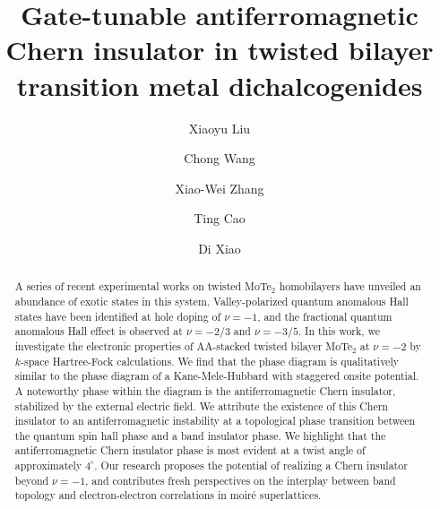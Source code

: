 \documentclass[twocolumn,aps,prl,superscriptaddress]{revtex4-2}
\begin{document}
\title{Gate-tunable antiferromagnetic Chern insulator in twisted bilayer transition metal dichalcogenides}

\author{Xiaoyu Liu}
\author{Chong Wang}
\author{Xiao-Wei Zhang}
\author{Ting Cao}
\author{Di Xiao}

\begin{abstract}
A series of recent experimental works on twisted MoTe$_2$ homobilayers have unveiled an abundance of exotic states in this system. Valley-polarized quantum anomalous Hall states have been identified at hole doping of $\nu = -1$, and the fractional quantum anomalous Hall effect is observed at $\nu = -2/3$ and $\nu = -3/5$. In this work, we investigate the electronic properties of AA-stacked twisted bilayer MoTe$_2$ at $\nu=-2$ by $k$-space Hartree-Fock calculations. We find that the phase diagram is qualitatively similar to the phase diagram of a Kane-Mele-Hubbard with staggered onsite potential. A noteworthy phase within the diagram is the antiferromagnetic Chern insulator, stabilized by the external electric field. We attribute the existence of this Chern insulator to an antiferromagnetic instability at a topological phase transition between the quantum spin hall phase and a band insulator phase. We highlight that the antiferromagnetic Chern insulator phase is most evident at a twist angle of approximately $4^\circ$. Our research proposes the potential of realizing a Chern insulator beyond $\nu=-1$, and contributes fresh perspectives on the interplay between band topology and electron-electron correlations in moir\'e superlattices.
\end{abstract}

\maketitle
\end{document}
